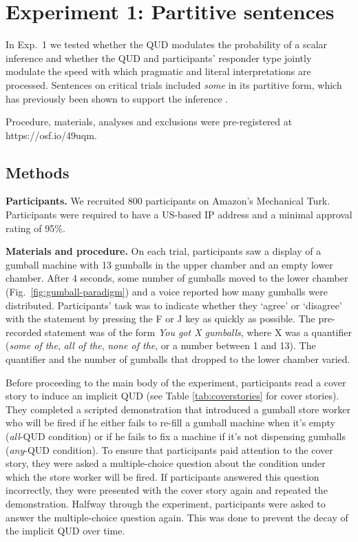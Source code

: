 \documentclass[10pt,letterpaper]{article}
\begin{document}
\section{Experiment 1: Partitive sentences}

In Exp.~1 we tested whether the QUD  modulates the probability of a scalar inference and whether the QUD and participants' responder type jointly modulate the speed with which pragmatic and literal interpretations are processed. Sentences on critical trials included \emph{some} in its partitive form, which has previously been shown to support the inference \cite{Degen2015}.

Procedure, materials, analyses and exclusions were pre-registered at https://osf.io/49uqm.


\subsection{Methods}

\noindent \textbf{Participants.} We recruited 800 participants on Amazon's Mechanical Turk. Participants were required to have a US-based IP address and a minimal approval rating of 95\%. %

\noindent \textbf{Materials and procedure.} On each trial, participants saw a display of a gumball machine with 13 gumballs in the upper chamber and an empty lower chamber. After 4 seconds, some number of gumballs moved to the lower chamber (Fig.~\ref{fig:gumball-paradigm}) and a voice reported how many gumballs were distributed. Participants' task was to indicate whether they `agree' or `disagree' with the statement by pressing the F or J key as quickly as possible. The pre-recorded statement was of the form \emph{You got X gumballs}, where X was a quantifier (\textit{some of the},  \textit{all of the}, \textit{none of the}, or a number between 1 and 13). The quantifier and the number of gumballs that dropped to the lower chamber varied.
  
Before proceeding to the main body of the experiment, participants read a cover story to induce an implicit QUD (see Table \ref{tab:coverstories} for cover stories). They completed a scripted demonstration that introduced a gumball store worker who will be fired if he either fails to re-fill a gumball machine when it's empty (\emph{all}-QUD condition) or if he fails to fix a machine if it's not dispensing gumballs (\emph{any}-QUD condition). To ensure that participants paid attention to the cover story, they were asked a multiple-choice question about the condition under which the store worker will be fired. If participants answered this question incorrectly, they were presented with the cover story again and repeated the demonstration. Halfway through the experiment, participants were asked to answer the multiple-choice question again. This was done to prevent the decay of the implicit QUD over time.  
 
\end{document}
